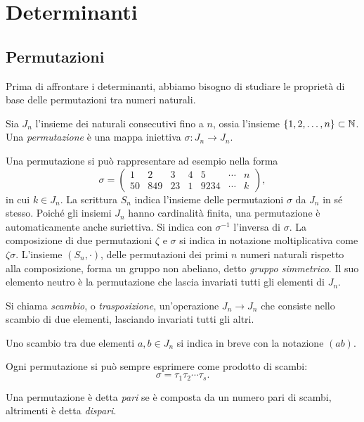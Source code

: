 \chapter{Determinanti}
\section{Permutazioni} \label{sec:permutazioni}
Prima di affrontare i determinanti, abbiamo bisogno di studiare le proprietà di base delle permutazioni tra numeri naturali.
\begin{definizione} \label{d:permutazione}
	Sia $J_n$ l'insieme dei naturali consecutivi fino a $n$, ossia l'insieme $\{1,2,\dots,n\}\subset\mathbb{N}$.
	Una \emph{permutazione} è una mappa iniettiva $\sigma\colon J_n\to J_n$.
\end{definizione}
Una permutazione si può rappresentare ad esempio nella forma
\begin{equation*}
\sigma=\begin{pmatrix}1&2&3&4&5&\cdots&n\\50&849&23&1&9234&\cdots&k\end{pmatrix},
\end{equation*}
in cui $k\in J_n$.
La scrittura $S_n$ indica l'insieme delle permutazioni $\sigma$ da $J_n$ in sé stesso.
Poiché gli insiemi $J_n$ hanno cardinalità finita, una permutazione è automaticamente anche suriettiva.
Si indica con $\sigma^{-1}$ l'inversa di $\sigma$.
La composizione di due permutazioni $\zeta$ e $\sigma$ si indica in notazione moltiplicativa come $\zeta\sigma$.
L'insieme $(S_n,\cdot)$, delle permutazioni dei primi $n$ numeri naturali rispetto alla composizione, forma un gruppo non abeliano, detto \emph{gruppo simmetrico}.
Il suo elemento neutro è la permutazione che lascia invariati tutti gli elementi di $J_n$.
\begin{definizione} \label{d:scambio}
	Si chiama \emph{scambio}, o \emph{trasposizione}, un'operazione $J_n\to J_n$ che consiste nello scambio di due elementi, lasciando invariati tutti gli altri.
\end{definizione}
Uno scambio tra due elementi $a,b\in J_n$ si indica in breve con la notazione $(ab)$.
\begin{proprieta} \label{pr:permutazione-prodotto-scambi}
	Ogni permutazione si può sempre esprimere come prodotto di scambi:
	\begin{equation*}
		\sigma=\tau_1\tau_2\cdots\tau_s.
	\end{equation*}
\end{proprieta}
Una permutazione è detta \emph{pari} se è composta da un numero pari di scambi, altrimenti è detta \emph{dispari}.
